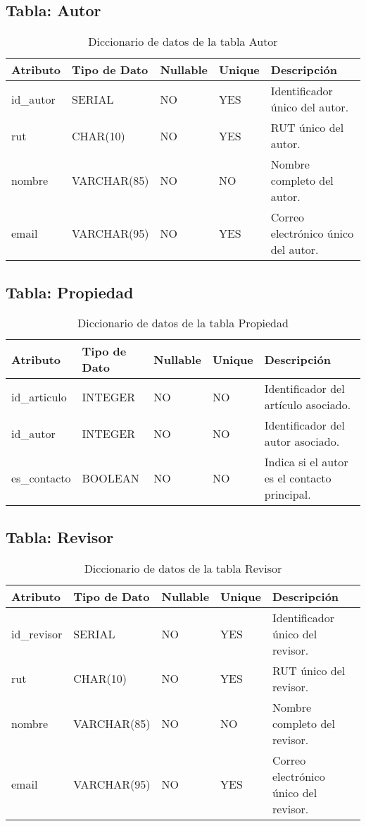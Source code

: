 \documentclass{article}
\begin{document}
\subsection{Tabla: Autor}
\begin{table}[H]
\centering
\begin{tabular}{|l|l|l|l|p{6cm}|}
\hline
\textbf{Atributo} & \textbf{Tipo de Dato} & \textbf{Nullable} & \textbf{Unique} & \textbf{Descripción} \\ \hline
id\_autor & SERIAL & NO & YES & Identificador único del autor. \\ \hline
rut & CHAR(10) & NO & YES & RUT único del autor. \\ \hline
nombre & VARCHAR(85) & NO & NO & Nombre completo del autor. \\ \hline
email & VARCHAR(95) & NO & YES & Correo electrónico único del autor. \\ \hline
\end{tabular}
\caption{Diccionario de datos de la tabla Autor}
\label{tab:autor}
\end{table}

\subsection{Tabla: Propiedad}
\begin{table}[H]
\centering
\begin{tabular}{|l|l|l|l|p{6cm}|}
\hline
\textbf{Atributo} & \textbf{Tipo de Dato} & \textbf{Nullable} & \textbf{Unique} & \textbf{Descripción} \\ \hline
id\_articulo & INTEGER & NO & NO & Identificador del artículo asociado. \\ \hline
id\_autor & INTEGER & NO & NO & Identificador del autor asociado. \\ \hline
es\_contacto & BOOLEAN & NO & NO & Indica si el autor es el contacto principal. \\ \hline
\end{tabular}
\caption{Diccionario de datos de la tabla Propiedad}
\label{tab:propiedad}
\end{table}

\subsection{Tabla: Revisor}
\begin{table}[H]
\centering
\begin{tabular}{|l|l|l|l|p{6cm}|}
\hline
\textbf{Atributo} & \textbf{Tipo de Dato} & \textbf{Nullable} & \textbf{Unique} & \textbf{Descripción} \\ \hline
id\_revisor & SERIAL & NO & YES & Identificador único del revisor. \\ \hline
rut & CHAR(10) & NO & YES & RUT único del revisor. \\ \hline
nombre & VARCHAR(85) & NO & NO & Nombre completo del revisor. \\ \hline
email & VARCHAR(95) & NO & YES & Correo electrónico único del revisor. \\ \hline
\end{tabular}
\caption{Diccionario de datos de la tabla Revisor}
\label{tab:revisor}
\end{table}
\end{document}
